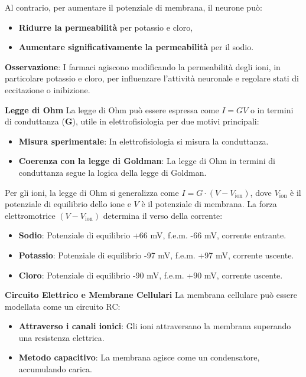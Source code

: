 {Al contrario, per aumentare il potenziale di membrana, il neurone può:
\begin{itemize}
    \item \textbf{Ridurre la permeabilità} per potassio e cloro,
    \item \textbf{Aumentare significativamente la permeabilità} per il sodio.
\end{itemize}

\textbf{Osservazione}: I farmaci agiscono modificando la permeabilità degli ioni, in particolare potassio e cloro, per influenzare l'attività neuronale e regolare stati di eccitazione o inibizione.

\textbf{Legge di Ohm} La legge di Ohm può essere espressa come \( I = GV \) o in termini di conduttanza (\textbf{G}), utile in elettrofisiologia per due motivi principali:

\begin{itemize}
    \item \textbf{Misura sperimentale}: In elettrofisiologia si misura la conduttanza.
    \item \textbf{Coerenza con la legge di Goldman}: La legge di Ohm in termini di conduttanza segue la logica della legge di Goldman.
\end{itemize}

Per gli ioni, la legge di Ohm si generalizza come \(I = G \cdot (V - V_{\text{ion}})\), dove \( V_{\text{ion}} \) è il potenziale di equilibrio dello ione e \( V \) è il potenziale di membrana. La forza elettromotrice \((V - V_{\text{ion}})\) determina il verso della corrente:

\begin{itemize}
    \item \textbf{Sodio}: Potenziale di equilibrio +66 mV, f.e.m. -66 mV, corrente entrante.
    \item \textbf{Potassio}: Potenziale di equilibrio -97 mV, f.e.m. +97 mV, corrente uscente.
    \item \textbf{Cloro}: Potenziale di equilibrio -90 mV, f.e.m. +90 mV, corrente uscente.
\end{itemize}

\textbf{Circuito Elettrico e Membrane Cellulari} La membrana cellulare può essere modellata come un circuito RC:
\begin{itemize}
    \item \textbf{Attraverso i canali ionici}: Gli ioni attraversano la membrana superando una resistenza elettrica.
    \item \textbf{Metodo capacitivo}: La membrana agisce come un condensatore, accumulando carica.
\end{itemize}

}
